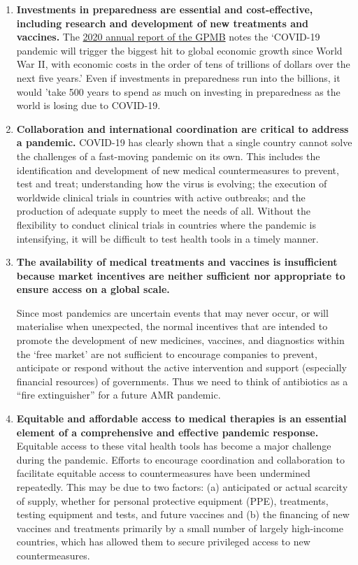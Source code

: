 \documentclass[
  11pt,
  paper=a4,
  ,captions=tableheading
]{scrartcl}
\begin{document}
\begin{enumerate}
\def\labelenumi{\arabic{enumi}.}
\item
  \textbf{Investments in preparedness are essential and cost-effective,
  including research and development of new treatments and vaccines.}
  The
  \href{https://apps.who.int/gpmb/assets/annual_report/\%20GPMB_AR_2020_EN.pdf}{2020
  annual report of the GPMB} notes the `COVID-19 pandemic will trigger
  the biggest hit to global economic growth since World War II, with
  economic costs in the order of tens of trillions of dollars over the
  next five years.' Even if investments in preparedness run into the
  billions, it would 'take 500 years to spend as much on investing in
  preparedness as the world is losing due to COVID-19.
\item
  \textbf{Collaboration and international coordination are critical to
  address a pandemic.} COVID-19 has clearly shown that a single country
  cannot solve the challenges of a fast-moving pandemic on its own. This
  includes the identification and development of new medical
  countermeasures to prevent, test and treat; understanding how the
  virus is evolving; the execution of worldwide clinical trials in
  countries with active outbreaks; and the production of adequate supply
  to meet the needs of all. Without the flexibility to conduct clinical
  trials in countries where the pandemic is intensifying, it will be
  difficult to test health tools in a timely manner.
\item
  \textbf{The availability of medical treatments and vaccines is
  insufficient because market incentives are neither sufficient nor
  appropriate to ensure access on a global scale.}

  Since most pandemics are uncertain events that may never occur, or
  will materialise when unexpected, the normal incentives that are
  intended to promote the development of new medicines, vaccines, and
  diagnostics within the `free market' are not sufficient to encourage
  companies to prevent, anticipate or respond without the active
  intervention and support (especially financial resources) of
  governments. Thus we need to think of antibiotics as a ``fire
  extinguisher'' for a future AMR pandemic.
\item
  \textbf{Equitable and affordable access to medical therapies is an
  essential element of a comprehensive and effective pandemic response.}
  Equitable access to these vital health tools has become a major
  challenge during the pandemic. Efforts to encourage coordination and
  collaboration to facilitate equitable access to countermeasures have
  been undermined repeatedly. This may be due to two factors: (a)
  anticipated or actual scarcity of supply, whether for personal
  protective equipment (PPE), treatments, testing equipment and tests,
  and future vaccines and (b) the financing of new vaccines and
  treatments primarily by a small number of largely high-income
  countries, which has allowed them to secure privileged access to new
  countermeasures.


\end{enumerate}
\end{document}

